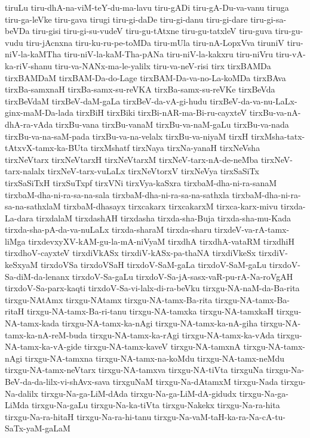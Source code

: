 {tiruLu
tiru-dhA-na-viM-teY-du-ma-lavu
tiru-gADi
tiru-gA-Du-va-vanu
tiruga
tiru-ga-leVke
tiru-gava
tirugi
tiru-gi-daDe
tiru-gi-danu
tiru-gi-dare
tiru-gi-sa-beVDa
tiru-gisi
tiru-gi-su-vudeV
tiru-gu-tAtxne
tiru-gu-tatxleV
tiru-guva
tiru-gu-vudu
tiru-jAcnxna
tiru-ku-ru-pe-toMDa
tiru-mUla
tiru-nA-LopxVva
tiruniV
tiru-niV-la-kaMTha
tiru-niV-la-kaM-Tha-pANa
tiru-niV-la-kakxru
tiru-niVru
tiru-vA-ka-riV-shanu
tiru-va-NANx-ma-le-yalilx
tiru-va-neV-risi
tirx
tirxBAMDa
tirxBAMDaM
tirxBAM-Da-do-Lage
tirxBAM-Da-va-no-La-koMDa
tirxBAva
tirxBa-samxnaH
tirxBa-samx-su-reVKA
tirxBa-samx-su-reVKe
tirxBeVda
tirxBeVdaM
tirxBeV-daM-gaLa
tirxBeV-da-vA-gi-hudu
tirxBeV-da-va-nu-LaLx-ginx-maM-Da-lada
tirxBiH
tirxBiki
tirxBi-nAR-ma-Bi-ru-cayxteV
tirxBu-va-nA-dhA-ra-vAda
tirxBu-vana
tirxBu-vanaM
tirxBu-va-naM-gaLu
tirxBu-va-nada
tirxBu-va-na-saM-pada
tirxBu-va-na-velalx
tirxBu-va-niyaM
tirxH
tirxMsha-tatx-tAtxvX-tamx-ka-BUta
tirxMshatf
tirxNaya
tirxNa-yanaH
tirxNeVsha
tirxNeVtarx
tirxNeVtarxH
tirxNeVtarxM
tirxNeV-tarx-nA-de-neMba
tirxNeV-tarx-nalalx
tirxNeV-tarx-vuLaLx
tirxNeVtorxV
tirxNeVya
tirxSaSiTx
tirxSaSiTxH
tirxSuTxpf
tirxVNi
tirxVya-kaSxra
tirxbaM-dha-ni-ra-sanaM
tirxbaM-dha-ni-ra-sa-na-sala
tirxbaM-dha-ni-ra-sa-na-sathxla
tirxbaM-dha-ni-ra-sa-na-sathxlaM
tirxbaM-dhasayx
tirxcakarx
tirxcakarxM
tirxca-karx-mivu
tirxda-La-dara
tirxdalaM
tirxdashAH
tirxdasha
tirxda-sha-Buja
tirxda-sha-mu-Kada
tirxda-sha-pA-da-va-nuLaLx
tirxda-sharaM
tirxda-sharu
tirxdeV-va-rA-tamx-liMga
tirxdevxyXV-kAM-gu-la-mA-niVyaM
tirxdhA
tirxdhA-vataRM
tirxdhiH
tirxdhoV-cayxteV
tirxdiVkASx
tirxdiV-kASx-pa-thaNA
tirxdiVkeSx
tirxdiV-keSxyaM
tirxdoVSa
tirxdoVSaH
tirxdoV-SaM-gaLa
tirxdoV-SaM-gaLu
tirxdoV-Sa-diM-da-lenanx
tirxdoV-Sa-gaLu
tirxdoV-Sa-jA-sasx-vaR-pu-rA-Na-roVgAH
tirxdoV-Sa-parx-kaqti
tirxdoV-Sa-vi-lalx-di-ra-beVku
tirxgu-NA-naM-da-Ba-rita
tirxgu-NAtAmx
tirxgu-NAtamx
tirxgu-NA-tamx-Ba-rita
tirxgu-NA-tamx-Ba-ritaH
tirxgu-NA-tamx-Ba-ri-tanu
tirxgu-NA-tamxka
tirxgu-NA-tamxkaH
tirxgu-NA-tamx-kada
tirxgu-NA-tamx-ka-nAgi
tirxgu-NA-tamx-ka-nA-giha
tirxgu-NA-tamx-ka-nA-reM-buda
tirxgu-NA-tamx-ka-rAgi
tirxgu-NA-tamx-ka-vAda
tirxgu-NA-tamx-ka-vA-gide
tirxgu-NA-tamx-kaveV
tirxgu-NA-tamxnA
tirxgu-NA-tamx-nAgi
tirxgu-NA-tamxna
tirxgu-NA-tamx-na-koMdu
tirxgu-NA-tamx-neMdu
tirxgu-NA-tamx-neVtarx
tirxgu-NA-tamxva
tirxgu-NA-tiVta
tirxguNa
tirxgu-Na-BeV-da-da-lilx-vi-shAvx-sava
tirxguNaM
tirxgu-Na-dAtamxM
tirxgu-Nada
tirxgu-Na-dalilx
tirxgu-Na-ga-LiM-dAda
tirxgu-Na-ga-LiM-dA-gidudx
tirxgu-Na-ga-LiMda
tirxgu-Na-gaLu
tirxgu-Na-ka-tiVta
tirxgu-Nakekx
tirxgu-Na-ra-hita
tirxgu-Na-ra-hitaH
tirxgu-Na-ra-hi-tanu
tirxgu-Na-vaM-taH-ka-ra-Na-cA-tu-SaTx-yaM-gaLaM
}

